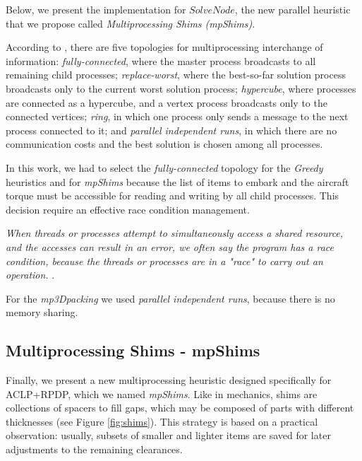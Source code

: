 \documentclass[preprint,authoryear]{elsarticle}
\begin{document}
Below, we present the implementation for $SolveNode$, the new parallel heuristic that we propose called {\it Multiprocessing Shims (mpShims)}.

According to \cite[p.226]{manfrin2006}, there are five topologies for multiprocessing interchange of information: {\it fully-connected}, where the master process broadcasts to all remaining child processes; {\it replace-worst}, where the best-so-far solution process broadcasts only to the current worst solution process; {\it hypercube}, where processes are connected as a hypercube, and a vertex process broadcasts only to the connected vertices; {\it ring}, in which one process only sends a message to the next process connected to it; and {\it parallel independent runs}, in which there are no communication costs and the best solution is chosen among all processes.

In this work, we had to select the {\it fully-connected} topology for the {\it Greedy} heuristics and for {\it mpShims} because the list of items to embark and the aircraft torque must be accessible for reading and writing by all child processes. This decision require an effective race condition management.

{\it When threads or processes attempt to simultaneously access a shared resource, and the accesses can result in an error, we often say the program has a race condition, because the threads or processes are in a "race" to carry out an operation.} \cite[p. 53]{Pacheco:2020}.

For the {\it mp3Dpacking} we used {\it parallel independent runs}, because there is no memory sharing.


\subsection{Multiprocessing Shims - mpShims}


Finally, we present a new multiprocessing heuristic designed specifically for ACLP+RPDP, which we named \emph{mpShims}. Like in mechanics, shims are collections of spacers to fill gaps, which may be composed of parts with different thicknesses (see Figure \ref{fig:shims}). This strategy is based on a practical observation: usually, subsets of smaller and lighter items are saved for later adjustments to the remaining clearances.
\end{document}
